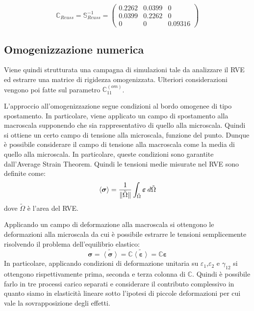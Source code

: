 \documentclass[a4paper,num-refs]{oup-contemporary}
\begin{document}
\begin{equation}
	\mathbb C_{Reuss}=\mathbb S_{Reuss}^{-1}=\begin{pmatrix}
0.2262&0.0399&0\\
0.0399&0.2262&0\\
0&0&0.09316
	\end{pmatrix}
\end{equation}


\subsection{Omogenizzazione numerica}
\label{sec:homogen}

Viene quindi strutturata una campagna di simulazioni tale da analizzare il RVE ed estrarre una matrice di rigidezza omogenizzata. Ulteriori considerazioni vengono poi fatte sul parametro $\mathbb C_{11}^{(om)}$.

L'approccio all'omogenizzazione segue condizioni al bordo omogenee di tipo spostamento.  
In particolare, viene applicato un campo di spostamento alla macroscala supponendo che sia rappresentativo di quello alla microscala. Quindi si ottiene un certo campo di tensione alla microscala, funzione del punto. Dunque è possibile considerare il campo di tensione alla macroscala come la media di quello alla microscala. In particolare, queste condizioni sono garantite dall'Average Strain Theorem.
Quindi le tensioni medie misurate nel RVE sono definite come:
\begin{equation}
	\left< \boldsymbol{\sigma}\right> ={1\over \|\tilde \Omega\|}\int _{\tilde \Omega} \boldsymbol{\varepsilon} \:d\tilde \Omega
\end{equation}
dove $\tilde \Omega$ è l'area del RVE.

Applicando un campo di deformazione alla macroscala si ottengono le deformazioni alla microscala da cui è possibile estrarre le tensioni semplicemente risolvendo il problema dell'equilibrio elastico:
\begin{equation}
\boldsymbol{\sigma}=\tilde{\left<{\boldsymbol{\sigma}}\right>}=\mathbb C\tilde{\left<{\boldsymbol{\varepsilon}}\right>}=\mathbb C \boldsymbol{\varepsilon}
\end{equation}
In particolare, applicando condizioni di deformazione unitaria su $\varepsilon_1$,$\varepsilon_2$ e $\gamma_{12}$ si ottengono rispettivamente prima, seconda e terza colonna di $\mathbb C$. Quindi è possibile farlo in tre processi carico separati e considerare il contributo complessivo in quanto siamo in elasticità lineare sotto l'ipotesi di piccole deformazioni per cui vale la sovrapposizione degli effetti.
\end{document}
